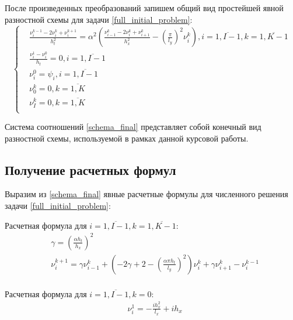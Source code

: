 {{			После произведенных преобразований запишем общий вид простейшей явной разностной схемы для задачи \eqref{full_initial_problem}:
			\begin{equation} \label{schema_final}
					\left\{
					\begin{split}
						&\frac{\nu^{k-1}_i - 2\nu^{k}_i + \nu^{k+1}_i}{h_t^2} = \alpha^2\left(\frac{\nu^{k}_{i-1} - 2\nu^{k}_i + \nu^{k}_{i+1}}{h_x^2} - \left(\frac{\pi}{l_y}\right)^2 \nu^{k}_i\right) ,  i =  \overline{ 1, I-1}, k =  \overline{ 1, K-1}\\
						& \frac{\nu^{1}_i - \nu^{0}_i}{h_t} = 0,  i = \overline{ 1, I-1} \\
						&\nu^0_{i} = \psi_i, i =  \overline{ 1, I-1}\\
						&\nu^k_{0} = 0, k =  \overline{1, K}\\
						&\nu^k_{I} = 0, k =  \overline{1, K}\\
					\end{split}
					\right.
				\end{equation}
			
			Система соотношений \eqref{schema_final} представляет собой конечный вид разностной схемы, используемой в рамках данной курсовой работы. 
	
	}
	\subsection{Получение расчетных формул}{
		Выразим из \eqref{schema_final} явные расчетные формулы для численного решения задачи \eqref{full_initial_problem}:
		
		Расчетная формула для $i =  \overline{ 1, I-1}, k =  \overline{ 1, K-1}$:
		\begin{equation} \label{solution_main}
			\begin{split}
			& \gamma = \left(\frac{\alpha h_t}{h_x}\right)^2 \\
			& \nu^{k+1}_i = \gamma\nu^k_{i-1}+\left(-2\gamma+2-\left(\frac{\alpha\pi h_t}{l_y}\right)^2\right)\nu^k_i + \gamma\nu^k_{i+1}-\nu^{k-1}_i \\
			\end{split}
		\end{equation}
		
		Расчетная формула для $i =  \overline{ 1, I-1}, k =  0$:
		\begin{equation} \label{solution_k0}
		\begin{split}
		& \nu^{1}_i = -\frac{ih_x^2}{l_x} + ih_x \\
		\end{split}
		\end{equation}
		
}}
